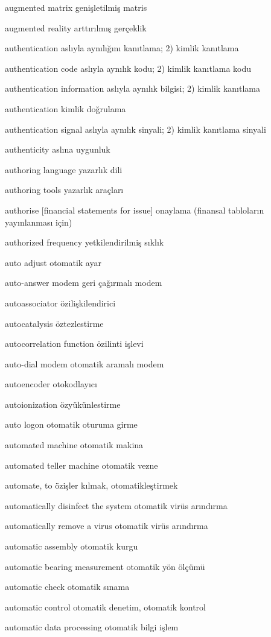 \documentclass[12pt,fleqn]{article}\usepackage{../../common}
\begin{document}
augmented matrix genişletilmiş matris

augmented reality arttırılmış gerçeklik

authentication aslıyla aynılığını kanıtlama; 2) kimlik kanıtlama

authentication code aslıyla aynılık kodu; 2) kimlik kanıtlama kodu

authentication information aslıyla aynılık bilgisi; 2) kimlik kanıtlama

authentication kimlik doğrulama

authentication signal aslıyla aynılık sinyali; 2) kimlik kanıtlama sinyali

authenticity aslına uygunluk

authoring language yazarlık dili

authoring tools yazarlık araçları

authorise [financial statements for issue] onaylama (finansal tabloların yayınlanması için)

authorized frequency yetkilendirilmiş sıklık

auto adjust otomatik ayar

auto-answer modem geri çağırmalı modem

autoassociator özilişkilendirici

autocatalysis öztezlestirme

autocorrelation function özilinti işlevi

auto-dial modem otomatik aramalı modem

autoencoder otokodlayıcı

autoionization özyükünlestirme

auto logon otomatik oturuma girme

automated machine otomatik makina

automated teller machine otomatik vezne

automate, to özişler kılmak, otomatikleştirmek

automatically disinfect the system otomatik virüs arındırma

automatically remove a virus otomatik virüs arındırma

automatic assembly otomatik kurgu

automatic bearing measurement otomatik yön ölçümü

automatic check otomatik sınama

automatic control otomatik denetim, otomatik kontrol

automatic data processing otomatik bilgi işlem
\end{document}
